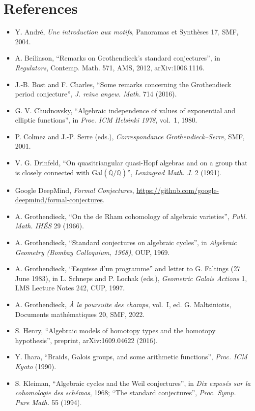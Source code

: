 \documentclass[11pt,a4paper]{article}
\newcommand{\q}[1]{“#1”}
\begin{document}
\section*{References}
\small\raggedright
\begin{itemize}[leftmargin=*]
\item Y. André, \emph{Une introduction aux motifs}, Panoramas et Synthèses 17, SMF, 2004.
\item A. Beilinson, \q{Remarks on Grothendieck's standard conjectures}, in \emph{Regulators}, Contemp. Math. 571, AMS, 2012, arXiv:1006.1116.
\item J.-B. Bost and F. Charles, \q{Some remarks concerning the Grothendieck period conjecture}, \emph{J. reine angew. Math.} 714 (2016).
\item G. V. Chudnovsky, \q{Algebraic independence of values of exponential and elliptic functions}, in \emph{Proc. ICM Helsinki 1978}, vol.~1, 1980.
\item P. Colmez and J.-P. Serre (eds.), \emph{Correspondance Grothendieck--Serre}, SMF, 2001.
\item V. G. Drinfeld, \q{On quasitriangular quasi-Hopf algebras and on a group that is closely connected with $\mathrm{Gal}(\overline{\mathbb Q}/\mathbb Q)$}, \emph{Leningrad Math. J.} 2 (1991).
\item Google DeepMind, \emph{Formal Conjectures}, \url{https://github.com/google-deepmind/formal-conjectures}.
\item A. Grothendieck, \q{On the de Rham cohomology of algebraic varieties}, \emph{Publ. Math. IHÉS} 29 (1966).
\item A. Grothendieck, \q{Standard conjectures on algebraic cycles}, in \emph{Algebraic Geometry (Bombay Colloquium, 1968)}, OUP, 1969.
\item A. Grothendieck, \q{Esquisse d'un programme} and letter to G. Faltings (27 June 1983), in L. Schneps and P. Lochak (eds.), \emph{Geometric Galois Actions} 1, LMS Lecture Notes 242, CUP, 1997.
\item A. Grothendieck, \emph{À la poursuite des champs}, vol.~I, ed. G. Maltsiniotis, Documents mathématiques 20, SMF, 2022.
\item S. Henry, \q{Algebraic models of homotopy types and the homotopy hypothesis}, preprint, arXiv:1609.04622 (2016).
\item Y. Ihara, \q{Braids, Galois groups, and some arithmetic functions}, \emph{Proc. ICM Kyoto} (1990).
\item S. Kleiman, \q{Algebraic cycles and the Weil conjectures}, in \emph{Dix exposés sur la cohomologie des schémas}, 1968; \q{The standard conjectures}, \emph{Proc. Symp. Pure Math.} 55 (1994).

\end{itemize}
\end{document}
